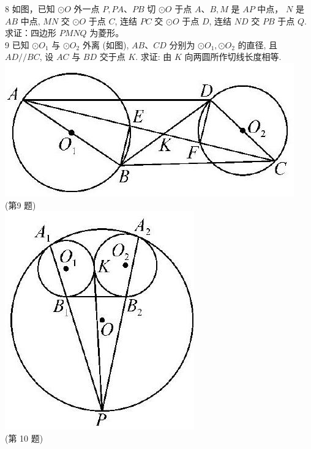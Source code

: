 \documentclass[10pt]{article}
\begin{document}
8 如图，已知 $\odot O$ 外一点 $P, P A 、 P B$ 切 $\odot O$ 于点 $A 、 B, M$ 是 $A P$ 中点， $N$ 是 $A B$ 中点, $M N$ 交 $\odot O$ 于点 $C$, 连结 $P C$ 交 $\odot O$ 于点 $D$, 连结 $N D$ 交 $P B$ 于点 $Q$.求证：四边形 $P M N Q$ 为菱形。\\
9 已知 $\odot O_{1}$ 与 $\odot O_{2}$ 外离 (如图), $A B 、 C D$ 分别为 $\odot O_{1}, \odot O_{2}$ 的直径, 且 $A D / / B C$, 设 $A C$ 与 $B D$ 交于点 $K$. 求证: 由 $K$ 向两圆所作切线长度相等.\\
\includegraphics[max width=\textwidth, center]{2024_10_30_66b8e5e701da2093c133g-064(3)}\\
(第9 题)\\
\includegraphics[max width=\textwidth, center]{2024_10_30_66b8e5e701da2093c133g-064(1)}\\
(第 10 题)
\end{document}
